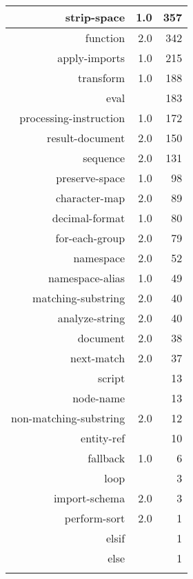 \begin{tabular}{|r|r|r|}
\hline
strip-space&1.0&357\\
\hline
function&2.0&342\\
\hline
apply-imports&1.0&215\\
\hline
transform&1.0&188\\
\hline
eval&&183\\
\hline
processing-instruction&1.0&172\\
\hline
result-document&2.0&150\\
\hline
sequence&2.0&131\\
\hline
preserve-space&1.0&98\\
\hline
character-map&2.0&89\\
\hline
decimal-format&1.0&80\\
\hline
for-each-group&2.0&79\\
\hline
namespace&2.0&52\\
\hline
namespace-alias&1.0&49\\
\hline
matching-substring&2.0&40\\
\hline
analyze-string&2.0&40\\
\hline
document&2.0&38\\
\hline
next-match&2.0&37\\
\hline
script&&13\\
\hline
node-name&&13\\
\hline
non-matching-substring&2.0&12\\
\hline
entity-ref&&10\\
\hline
fallback&1.0&6\\
\hline
loop&&3\\
\hline
import-schema&2.0&3\\
\hline
perform-sort&2.0&1\\
\hline
elsif&&1\\
\hline
else&&1\\
\hline
&&\\
\hline
\end{tabular}
\begin{tabular}{|r|r|r|}
\hline
\end{tabular}
